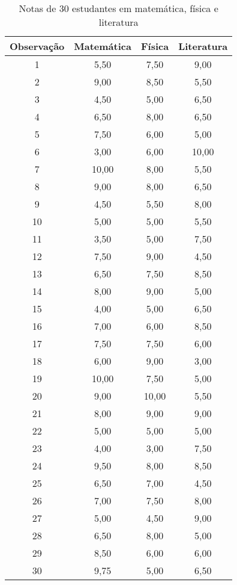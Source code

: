 \begin{table}
    \centering
    \begin{tabular}{cccc}
    \toprule
    Observação & Matemática & Física & Literatura \\
    \midrule
    1          & 5,50       & 7,50   & 9,00       \\
    2          & 9,00       & 8,50   & 5,50       \\
    3          & 4,50       & 5,00   & 6,50       \\
    4          & 6,50       & 8,00   & 6,50       \\
    5          & 7,50       & 6,00   & 5,00       \\
    6          & 3,00       & 6,00   & 10,00      \\
    7          & 10,00      & 8,00   & 5,50       \\
    8          & 9,00       & 8,00   & 6,50       \\
    9          & 4,50       & 5,50   & 8,00       \\
    10         & 5,00       & 5,00   & 5,50       \\
    11         & 3,50       & 5,00   & 7,50       \\
    12         & 7,50       & 9,00   & 4,50       \\
    13         & 6,50       & 7,50   & 8,50       \\
    14         & 8,00       & 9,00   & 5,00       \\
    15         & 4,00       & 5,00   & 6,50       \\
    16         & 7,00       & 6,00   & 8,50       \\
    17         & 7,50       & 7,50   & 6,00       \\
    18         & 6,00       & 9,00   & 3,00       \\
    19         & 10,00      & 7,50   & 5,00       \\
    20         & 9,00       & 10,00  & 5,50       \\
    21         & 8,00       & 9,00   & 9,00       \\
    22         & 5,00       & 5,00   & 5,00       \\
    23         & 4,00       & 3,00   & 7,50       \\
    24         & 9,50       & 8,00   & 8,50       \\
    25         & 6,50       & 7,00   & 4,50       \\
    26         & 7,00       & 7,50   & 8,00       \\
    27         & 5,00       & 4,50   & 9,00       \\
    28         & 6,50       & 8,00   & 5,00       \\
    29         & 8,50       & 6,00   & 6,00       \\
    30         & 9,75       & 5,00   & 6,50       \\
    \bottomrule
    \end{tabular}
    \caption{Notas de 30 estudantes em matemática, física e literatura}
    \label{tab:notas-estudantes}
\end{table}

